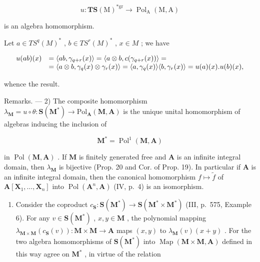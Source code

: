 \[
u: \mathbf {T S} (\mathrm{M}) ^ {* \mathrm{gr}} \rightarrow \operatorname{Pol} _ {\mathrm{A}} (\mathrm{M}, \mathrm{A})
\]

is an algebra homomorphism.

Let \(a \in TS^{q}(M)^{*}\) , \(b \in TS^{r}(M)^{*}\) , \(x \in M\) ; we have

\[
\begin{array}{r l} u (a b) (x) & = \langle a b, \gamma_ {q + r} (x) \rangle = \langle a \otimes b, c (\gamma_ {q + r} (x)) \rangle = \\ & = \langle a \otimes b, \gamma_ {q} (x) \otimes \gamma_ {r} (x) \rangle = \langle a, \gamma_ {q} (x) \rangle \langle b, \gamma_ {r} (x) \rangle = u (a) (x). u (b) (x), \end{array}
\]

whence the result.

Remarks. --- 2) The composite homomorphism \(\lambda_{\mathbf{M}}=u\circ\theta:\mathbf{S}(\mathbf{M}^{*})\to\mathrm{Pol}_{\mathbf{A}}(\mathbf{M},\mathbf{A})\) is the unique unital homomorphism of algebras inducing the inclusion of

\[
\mathbf {M} ^ {*} = \operatorname{Pol} ^ {1} (\mathbf {M}, \mathbf {A})
\]

in \(\operatorname{Pol}(\mathbf{M}, \mathbf{A})\) . If \(\mathbf{M}\) is finitely generated free and \(\mathbf{A}\) is an infinite integral domain, then \(\lambda_{\mathbf{M}}\) is bijective (Prop. 20 and Cor. of Prop. 19). In particular if \(\mathbf{A}\) is an infinite integral domain, then the canonical homomorphism \(f \mapsto \tilde{f}\) of \(\mathbf{A}[\mathbf{X}_1, \ldots, \mathbf{X}_n]\) into \(\operatorname{Pol}(\mathbf{A}^n, \mathbf{A})\) (IV, p.~4) is an isomorphism.

\begin{enumerate}
\def\labelenumi{\arabic{enumi})}
\setcounter{enumi}{2}
\tightlist
\item
  Consider the coproduct \(c_{\mathbf{S}}: \mathbf{S}(\mathbf{M}^{*}) \to \mathbf{S}(\mathbf{M}^{*} \times \mathbf{M}^{*})\) (III, p.~575, Example 6). For any \(v \in \mathbf{S}(\mathbf{M}^{*})\) , \(x, y \in \mathbf{M}\) , the polynomial mapping \(\lambda_{\mathbf{M} \times \mathbf{M}}(c_{\mathbf{S}}(v)): \mathbf{M} \times \mathbf{M} \to \mathbf{A}\) maps \((x, y)\) to \(\lambda_{\mathbf{M}}(v)(x + y)\) . For the two algebra homomorphisms of \(\mathbf{S}(\mathbf{M}^{*})\) into \(\operatorname{Map}(\mathbf{M} \times \mathbf{M}, \mathbf{A})\) defined in this way agree on \(\mathbf{M}^{*}\) , in virtue of the relation
\end{enumerate}

